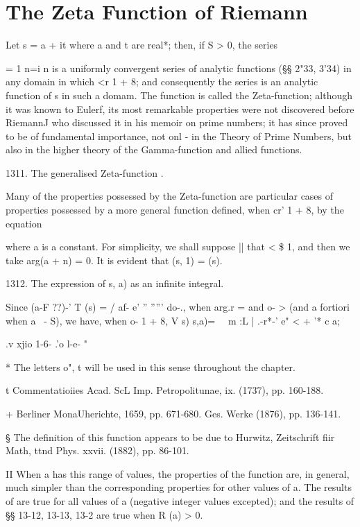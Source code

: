 %
%
\chapter{The Zeta Function of Riemann}


Let s = a + it where a and t are real*; then, if S > 0, the series

= 1 n=i n is a uniformly convergent series of analytic functions (§§
2"33, 3'34) in any domain in which <r 1 + 8; and consequently the
series is an analytic function of s in such a domam. The function is
called the Zeta-function; although it was known to Eulerf, its most
remarkable properties were not discovered before RiemannJ who
discussed it in his memoir on prime numbers; it has since proved to
be of fundamental importance, not onl - in the Theory of Prime
Numbers, but also in the higher theory of the Gamma-function and
allied functions.

1311. The generalised Zeta-function .

Many of the properties possessed by the Zeta-function are particular
cases of properties possessed by a more general function defined, when
cr' 1 + 8, by the equation

where a is a constant. For simplicity, we shall suppose || that < \$
1, and then we take arg(a + n) = 0. It is evident that (s, 1) = (s).

1312. The expression of s, a) as an infinite integral.

Since (a-F ??)-' T (s) = / af- e' '' ''''' do-., when arg.r = and o- >
(and a fortiori when a \ - S), we have, when o- 1 + 8, V s) s,a)= \ \
m :L | .-r*-' e" < + '* c a;

.v xjio 1-6- .'o l-e- "

* The letters o", t will be used in this sense throughout the chapter.

t Commentatioiies Acad. ScL Imp. Petropolitunae, ix. (1737), pp.
160-188.

+ Berliner MonaUherichte, 1659, pp. 671-680. Ges. Werke (1876), pp.
136-141.

§ The definition of this function appears to be due to Hurwitz,
Zeitschrift fiir Math, ttnd Phys. xxvii. (1882), pp. 86-101.

II When a has this range of values, the properties of the function
are, in general, much simpler than the corresponding properties for
other values of a. The results of\hardsubsectionref{13}{1}{4} are true for all values of a
(negative integer values excepted); and the results of §§ 13-12,
13-13, 13-2 are true when R (a) > 0.

